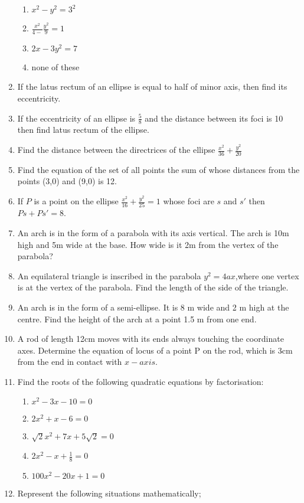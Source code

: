 \begin{enumerate}[label=\thesubsection.\arabic*,ref=\thesubsection.\theenumi]
\begin{enumerate}
\item $x^2-y^2=3^2$
\item $\frac{x^2}{4-}\frac{y^2}{9}=1$
\item $2x-3y^2=7$
 \item none of these
 \end{enumerate}
 \item If the latus rectum of an ellipse is equal to half of minor axis, then find its eccentricity.
 \item If the eccentricity of an ellipse is $\frac{5}{8}$ and  the distance between its foci is 10 then find latus rectum of the ellipse.
 \item Find the distance between the directrices of the ellipse $\frac{x^2}{36}+\frac{y^2}{20}$
\item Find the equation of the set of all points the sum of whose distances  from the points (3,0) and (9,0) is 12.
\item If ${P}$ is a point on the ellipse $\frac{x^2}{16}+\frac{y^2}{25}=1$ whose foci  are $s$ and $s'$ then $Ps +Ps'=8$.
\item An arch is in the form of a parabola with its axis vertical. The arch is 10m high and 5m wide at the base. How wide is it 2m from the vertex of the parabola?
\label{chapters/11/11/5/2}
\item An equilateral triangle is inscribed in the parabola $y^{2} = 4ax$,where one vertex is at the vertex of the parabola. Find the length of the side of the triangle.
\label{chapters/11/11/5/8}
\item An arch is in the form of a semi-ellipse. It is 8 m wide and 2 m high at the centre. Find the height of the arch at a point 1.5 m from one end.
\label{chapters/11/11/5/4}
\item A rod of length 12cm moves with its ends always touching the coordinate axes. Determine the equation of locus of a point  P on the rod, which is 3cm from the end in contact with $x-axis$.
\label{chapters/11/11/5/5}
\item  Find the roots of the following quadratic  equations by factorisation:
\begin{enumerate}
\item $x^2-3x-10=0$
\item $2x^2+x-6=0$
\item $ \sqrt 2x^2+7x+5 \sqrt 2=0$
\item $2x^2-x+\frac{1}{8}=0$
\item $100x^2-20x+1=0$
\end{enumerate}
\item Represent the following situations mathematically;

\end{enumerate}
